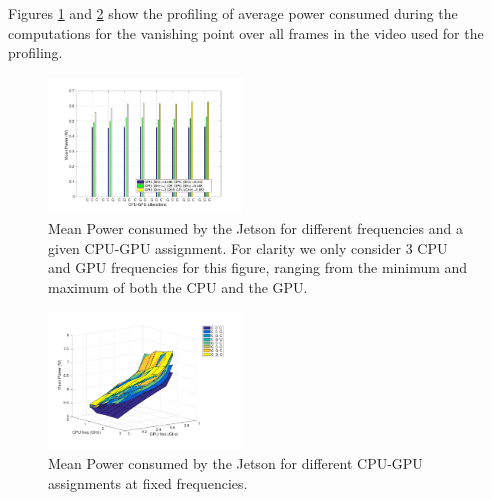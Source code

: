Figures \ref{fig:dfsa_pow} and \ref{fig:sfda_pow} show the profiling of average power consumed during the computations for the vanishing point over all frames in the video used for the profiling.


\begin{figure}[htbp]
\centering
\includegraphics[width=0.46\textwidth]{Data/figs/PowerHist.pdf}
\caption{Mean Power consumed by the Jetson for different frequencies and a given CPU-GPU assignment.  For clarity we only consider 3 CPU and GPU frequencies for this figure, ranging from the minimum and maximum of both the CPU and the GPU.}
\label{fig:dfsa_pow} %
\end{figure}

\begin{figure}[htbp]
	\centering
	\includegraphics[width=0.46\textwidth]{Data/figs/surf_Power.pdf}
	\caption{Mean Power consumed by the Jetson for different CPU-GPU assignments at fixed frequencies.}
	\label{fig:sfda_pow}%
\end{figure}


